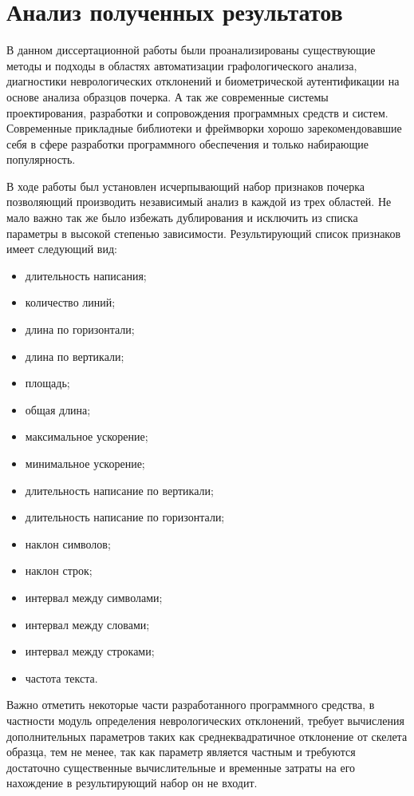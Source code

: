 \section{Анализ полученных результатов}
\label{sec:summary}

В данном диссертационной работы были проанализированы существующие методы и подходы в областях автоматизации графологического анализа, диагностики неврологических отклонений и биометрической аутентификации на основе анализа образцов почерка. А так же современные системы проектирования, разработки и сопровождения программных средств и систем. Современные прикладные библиотеки и фреймворки хорошо зарекомендовавшие себя в сфере разработки программного обеспечения и только набирающие популярность.

В ходе работы был установлен исчерпывающий набор признаков почерка позволяющий производить независимый анализ в каждой из трех областей. Не мало важно так же было избежать дублирования и исключить из списка параметры в высокой степенью зависимости.
Результирующий список признаков имеет следующий вид:
\begin{itemize}
  \item длительность написания;  
  \item количество линий;
  \item длина по горизонтали;
  \item длина по вертикали;
  \item площадь;
  \item общая длина;
  \item максимальное ускорение;
  \item минимальное ускорение;
  \item длительность написание по вертикали;
  \item длительность написание по горизонтали;
  \item наклон символов;
  \item наклон строк;
  \item интервал между символами;
  \item интервал между словами;
  \item интервал между строками;
  \item частота текста.
\end{itemize}

Важно отметить некоторые части разработанного программного средства, в частности модуль определения неврологических отклонений, требует вычисления дополнительных параметров таких как среднеквадратичное отклонение от скелета образца, тем не менее, так как параметр является частным и требуются достаточно существенные вычислительные и временные затраты на его нахождение в результирующий набор он не входит.

